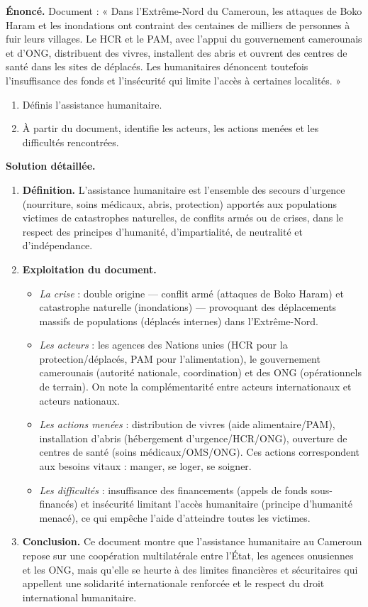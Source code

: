 \documentclass[11pt]{article}
\begin{document}
\begin{exoresolu}
\textbf{Énoncé.} Document : « Dans l'Extrême-Nord du Cameroun, les attaques de Boko Haram et les inondations ont contraint des centaines de milliers de personnes à fuir leurs villages. Le HCR et le PAM, avec l'appui du gouvernement camerounais et d'ONG, distribuent des vivres, installent des abris et ouvrent des centres de santé dans les sites de déplacés. Les humanitaires dénoncent toutefois l'insuffisance des fonds et l'insécurité qui limite l'accès à certaines localités. »
\begin{enumerate}
\item Définis l'assistance humanitaire.
\item À partir du document, identifie les acteurs, les actions menées et les difficultés rencontrées.
\end{enumerate}
\tcblower
\textbf{Solution détaillée.}
\begin{enumerate}
\item \textbf{Définition.} L'assistance humanitaire est l'ensemble des secours d'urgence (nourriture, soins médicaux, abris, protection) apportés aux populations victimes de catastrophes naturelles, de conflits armés ou de crises, dans le respect des principes d'humanité, d'impartialité, de neutralité et d'indépendance.
\item \textbf{Exploitation du document.}
\begin{itemize}
\item \emph{La crise} : double origine — conflit armé (attaques de Boko Haram) et catastrophe naturelle (inondations) — provoquant des déplacements massifs de populations (déplacés internes) dans l'Extrême-Nord.
\item \emph{Les acteurs} : les agences des Nations unies (HCR pour la protection/déplacés, PAM pour l'alimentation), le gouvernement camerounais (autorité nationale, coordination) et des ONG (opérationnels de terrain). On note la complémentarité entre acteurs internationaux et acteurs nationaux.
\item \emph{Les actions menées} : distribution de vivres (aide alimentaire/PAM), installation d'abris (hébergement d'urgence/HCR/ONG), ouverture de centres de santé (soins médicaux/OMS/ONG). Ces actions correspondent aux besoins vitaux : manger, se loger, se soigner.
\item \emph{Les difficultés} : insuffisance des financements (appels de fonds sous-financés) et insécurité limitant l'accès humanitaire (principe d'humanité menacé), ce qui empêche l'aide d'atteindre toutes les victimes.
\end{itemize}
\item \textbf{Conclusion.} Ce document montre que l'assistance humanitaire au Cameroun repose sur une coopération multilatérale entre l'État, les agences onusiennes et les ONG, mais qu'elle se heurte à des limites financières et sécuritaires qui appellent une solidarité internationale renforcée et le respect du droit international humanitaire.
\end{enumerate}
\end{exoresolu}
\end{document}
